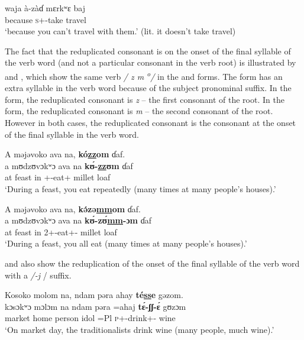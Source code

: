       \medskip
\gll waja à-zàɗ mɛrkʷɛ baj\\
     because  \textsc{s}+{\PFV}-take  travel  {\NEG}\\
\glt  ‘because you can’t travel with them.’ (lit. it doesn’t take travel)\\
\z 

The fact that the reduplicated consonant is on the onset of the final syllable of the verb word (and not a particular consonant in the verb root) is illustrated by  and , which show the same verb \textit{/ z m \textsuperscript{o}/} in the {\twoS} and {\twoP} forms. The {\twoP} form has an extra syllable in the verb word because of the {\twoP} subject pronominal suffix. In the {\twoS} form, the reduplicated consonant is \textit{z} -- the first consonant of the root. In the {\twoP} form, the reduplicated consonant is \textit{m} -- the second consonant of the root. However in both cases, the reduplicated consonant is the consonant at the onset of the final syllable in the verb word.

\ea\label{ex:7:86}
A  məjəvoko  ava  na,  \textbf{kó\underline{zz}om} ɗaf.\\
\gll  a   mʊdzʊvɔkʷɔ  ava  na   \textbf{k\'ʊ-\underline{zz}ʊm}    ɗaf\\
      at   feast    in  {\PSP}  {\twoS}+{\IFV}-eat+{\ITR}    {millet loaf}\\
\glt  ‘During a feast, you eat repeatedly (many times at many people’s houses).’\\
\z 

\ea\label{ex:7:87}
A  məjəvoko  ava  na,  \textbf{k\'əzə\underline{mm}om}  ɗaf.\\
\gll  a   mʊdzʊvɔkʷɔ  ava  na   \textbf{k\'ʊ-z\'ʊ\underline{mm}{}-ɔm}     ɗaf\\
      at   feast     in   {\PSP}  2+{\IFV}{}-eat+{\ITR}{}-{\twoP}  {millet loaf}\\
\glt  ‘During a feast, you all eat (many times at many people’s houses).’\\ 
\z  

 and  also show the reduplication of the onset of the final syllable of the verb word with a \textit{/-j }/\textit{ }suffix.

\ea\label{ex:7:88}
Kosoko  molom  na,  ndam  pəra  ahay  \textbf{té\underline{ss}e}  gəzom.\\
\gll  kɔsɔkʷɔ   mɔlɔm   na   ndam   pəra   =ahaj   \textbf{t\'ɛ-\underline{ʃʃ}{}-\'ɛ }      gʊzɔm\\
      market  home  {\PSP}  person  idol  =Pl  \textsc{p}+{\IFV}-drink+{\ITR}-{\CL}  wine\\
\glt  ‘On market day, the traditionalists drink wine (many people, much wine).’\\
\z 

